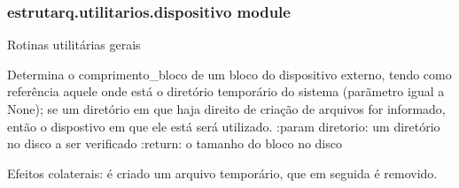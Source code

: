 \documentclass[letterpaper,10pt,brazil]{sphinxmanual}
\begin{document}

\begin{fulllineitems}
\label{\detokenize{estrutarq.utilitarios:estrutarq.utilitarios.disco.main}}
\pysigstartsignatures
{}
\pysigstopsignatures
\end{fulllineitems}



\subsubsection{estrutarq.utilitarios.dispositivo module}
\label{\detokenize{estrutarq.utilitarios:module-estrutarq.utilitarios.dispositivo}}\label{\detokenize{estrutarq.utilitarios:estrutarq-utilitarios-dispositivo-module}}
\sphinxAtStartPar
Rotinas utilitárias gerais

\begin{fulllineitems}
\label{\detokenize{estrutarq.utilitarios:estrutarq.utilitarios.dispositivo.comprimento_de_bloco}}
\pysigstartsignatures
{}
\pysigstopsignatures
\sphinxAtStartPar
Determina o comprimento\_bloco de um bloco do dispositivo externo, tendo como
referência aquele onde está o diretório temporário do sistema (parãmetro
igual a None); se um diretório em que haja direito de criação de arquivos
for informado, então o dispostivo em que ele está será utilizado.
:param diretorio: um diretório no disco a ser verificado
:return: o tamanho do bloco no disco

\sphinxAtStartPar
Efeitos colaterais: é criado um arquivo temporário, que em seguida
é removido.

\end{fulllineitems}
\end{document}
